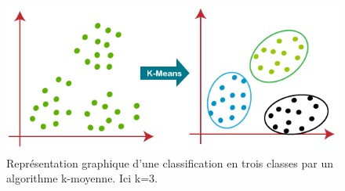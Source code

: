 \begin{figure}[ht]
  \centering
  \includegraphics[width=12cm]{./Chapitre2/figures/clustering.png}
  \caption{Représentation graphique d'une classification en trois classes par un algorithme k-moyenne. Ici k=3.}
  \label{fig:clustering}
\end{figure}
